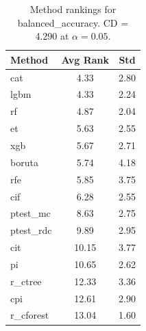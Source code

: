 \begin{table}[h]
\centering
\caption{Method rankings for balanced_accuracy. CD = 4.290 at $\alpha=0.05$.}
\label{tab:ranks_balanced_accuracy}
\begin{tabular}{lcc}
\toprule
Method & Avg Rank & Std \\
\midrule
cat & 4.33 & 2.80 \\
lgbm & 4.33 & 2.24 \\
rf & 4.87 & 2.04 \\
et & 5.63 & 2.55 \\
xgb & 5.67 & 2.71 \\
boruta & 5.74 & 4.18 \\
rfe & 5.85 & 3.75 \\
cif & 6.28 & 2.55 \\
ptest_mc & 8.63 & 2.75 \\
ptest_rdc & 9.89 & 2.95 \\
cit & 10.15 & 3.77 \\
pi & 10.65 & 2.62 \\
r_ctree & 12.33 & 3.36 \\
cpi & 12.61 & 2.90 \\
r_cforest & 13.04 & 1.60 \\
\bottomrule
\end{tabular}
\end{table}